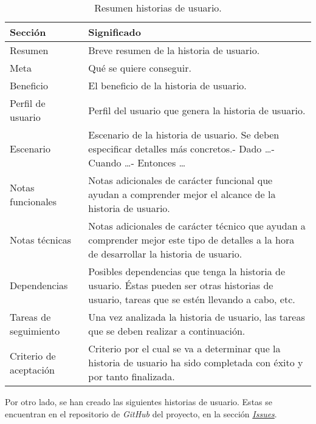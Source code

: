 \begin{table}[H]
    \centering
    \def\arraystretch{1.25}
    \begin{adjustbox}{max width=\textwidth}
    \begin{tabularx}{\textwidth}{l|L}
    \hline
        \textbf{Sección} & \textbf{Significado} \\ \hline
    \hline
        Resumen & Breve resumen de la historia de usuario. \\ \hline
        Meta & Qué se quiere conseguir. \\ \hline
        Beneficio & El beneficio de la historia de usuario. \\ \hline
        Perfil de usuario & Perfil del usuario que genera la historia de usuario. \\ \hline
        Escenario & Escenario de la historia de usuario. Se deben especificar detalles más concretos.\linebreak - Dado …\linebreak - Cuando …\linebreak - Entonces … \\ \hline
        Notas funcionales & Notas adicionales de carácter funcional que ayudan a comprender mejor el alcance de la historia de usuario. \\ \hline
        Notas técnicas & Notas adicionales de carácter técnico que ayudan a comprender mejor este tipo de detalles a la hora de desarrollar la historia de usuario. \\ \hline
        Dependencias & Posibles dependencias que tenga la historia de usuario. Éstas pueden ser otras historias de usuario, tareas que se estén llevando a cabo, etc. \\ \hline
        Tareas de seguimiento & Una vez analizada la historia de usuario, las tareas que se deben realizar a continuación. \\ \hline
        Criterio de aceptación & Criterio por el cual se va a determinar que la historia de usuario ha sido completada con éxito y por tanto finalizada. \\ \hline
    \end{tabularx}
    \end{adjustbox}
    \caption{Resumen historias de usuario.}
\end{table}

\bigskip

Por otro lado, se han creado las siguientes historias de usuario. Estas se encuentran en el repositorio\cite{matroos} de \textit{GitHub} del proyecto, en la sección \href{https://github.com/harvestcore/matroos/labels/US}{\textit{Issues}}.

